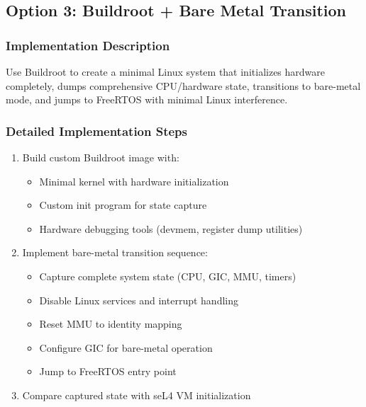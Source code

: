 \documentclass[11pt,a4paper]{article}
\begin{document}
\subsection{Option 3: Buildroot + Bare Metal Transition}

\subsubsection{Implementation Description}
Use Buildroot to create a minimal Linux system that initializes hardware completely, dumps comprehensive CPU/hardware state, transitions to bare-metal mode, and jumps to FreeRTOS with minimal Linux interference.

\subsubsection{Detailed Implementation Steps}
\begin{enumerate}
    \item Build custom Buildroot image with:
        \begin{itemize}
            \item Minimal kernel with hardware initialization
            \item Custom init program for state capture
            \item Hardware debugging tools (devmem, register dump utilities)
        \end{itemize}
    \item Implement bare-metal transition sequence:
        \begin{itemize}
            \item Capture complete system state (CPU, GIC, MMU, timers)
            \item Disable Linux services and interrupt handling
            \item Reset MMU to identity mapping
            \item Configure GIC for bare-metal operation
            \item Jump to FreeRTOS entry point
        \end{itemize}
    \item Compare captured state with seL4 VM initialization
\end{enumerate}
\end{document}
